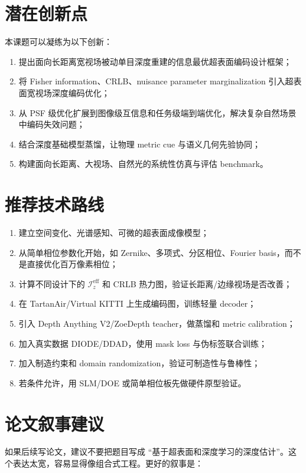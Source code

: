 \documentclass[11pt,a4paper,fontset=none]{ctexart}
\begin{document}
\section{潜在创新点}

本课题可以凝练为以下创新：

\begin{enumerate}
  \item 提出面向长距离宽视场被动单目深度重建的信息最优超表面编码设计框架；
  \item 将 Fisher information、CRLB、nuisance parameter marginalization 引入超表面宽视场深度编码优化；
  \item 从 PSF 级优化扩展到图像级互信息和任务级端到端优化，解决复杂自然场景中编码失效问题；
  \item 结合深度基础模型蒸馏，让物理 metric cue 与语义几何先验协同；
  \item 构建面向长距离、大视场、自然光的系统性仿真与评估 benchmark。
\end{enumerate}

\section{推荐技术路线}

\begin{enumerate}
  \item 建立空间变化、光谱感知、可微的超表面成像模型；
  \item 从简单相位参数化开始，如 Zernike、多项式、分区相位、Fourier basis，而不是直接优化百万像素相位；
  \item 计算不同设计下的 $\mathcal I_z^{\mathrm{eff}}$ 和 CRLB 热力图，验证长距离/边缘视场是否改善；
  \item 在 TartanAir/Virtual KITTI 上生成编码图，训练轻量 decoder；
  \item 引入 Depth Anything V2/ZoeDepth teacher，做蒸馏和 metric calibration；
  \item 加入真实数据 DIODE/DDAD，使用 mask loss 与伪标签联合训练；
  \item 加入制造约束和 domain randomization，验证可制造性与鲁棒性；
  \item 若条件允许，用 SLM/DOE 或简单相位板先做硬件原型验证。
\end{enumerate}

\section{论文叙事建议}

如果后续写论文，建议不要把题目写成 ``基于超表面和深度学习的深度估计''。这个表达太宽，容易显得像组合式工程。更好的叙事是：
\end{document}
